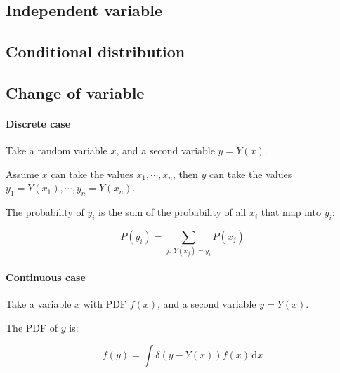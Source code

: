 \lipsum[8-9]

\subsection{Independent variable}
\label{subsec:independent_var}

\lipsum[9-10]

\subsection{Conditional distribution}
\label{subsec:cond_distr}

\lipsum[10-11]

\subsection{Change of variable}
\label{subsec:change_of_var}

\paragraph{Discrete case}

Take a random variable $x$, and a second variable $y = Y(x)$.

Assume $x$ can take the values $x_{1}, \cdots, x_{n}$, then $y$ can take the values $y_{1} = Y(x_{1}), \cdots, y_{n} = Y(x_{n})$. 

The probability of $y_{i}$ is the sum of the probability of all $x_{i}$ that map into $y_{i}$:

\begin{equation}\label{eq:change_of_var_discrete}
	P(y_{i}) = \sum_{j: \ Y(x_{j})= y_{i}} P(x_{j})
\end{equation}

\paragraph{Continuous case}

Take a variable $x$ with PDF $f(x)$, and a second variable $y = Y(x)$.

The PDF of $y$ is:

\begin{equation}\label{eq:change_of_var_continuous}
	f(y) = \int {\delta(y - Y(x)) f(x)} \,\mathrm{d}x
\end{equation}

